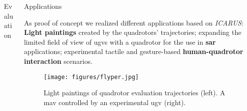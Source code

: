 \documentclass[final,hyperref={pdfpagelabels=false}]{beamer}
\newcommand{\blocktextwidth}{0.93\textwidth}
\newcommand{\icarus}{\textit{ICARUS}}
\begin{document}
\begin{frame}[t]
\begin{columns}[t]
\begin{column}{0.6375\textwidth}
\begin{columns}[T]
\begin{column}{0.486\textwidth}
\begin{block}{Evaluation}
\vspace{0.1em}

\begin{figure}
\centering\tiny
{}
\end{figure}

\end{block}


\end{column}

\hfill


\begin{column}{0.486\textwidth}


\begin{block}{Applications}
\begin{minipage}[]{\blocktextwidth}
As proof of concept we realized different applications based on \icarus{}:
\textbf{Light paintings} created by the quadrotors' trajectories;
expanding the limited field of view of \glspl{ugv} with a quadrotor for the use in \textbf{\gls{sar}} applications;
experimental tactile and gesture-based \textbf{human-quadrotor interaction} scenarios.
\end{minipage}
\end{block}

\begin{figure}
\hfill
\texttt{[image: figures/flyper.jpg]}
\caption*{Light paintings of quadrotor evaluation trajectories (left). A \gls{mav} controlled by an experimental \gls{ugv} (right).}
\end{figure}


\vspace{-0.8em}


\end{column}
\end{columns}
\end{column}
\end{columns}
\end{frame}
\end{document}
